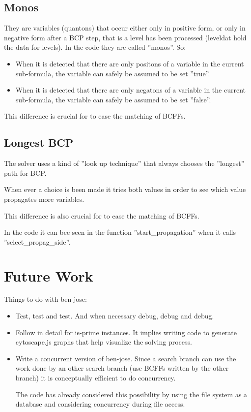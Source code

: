 \documentclass{easychair}
\newcommand{\quanton}{\textsf{quanton}}
\newcommand{\leveldat}{\textsf{leveldat}}
\begin{document}
\subsection{Monos}

They are variables ({\quanton}s) that occur either only in positive form, or only in negative form after a BCP step, that is a level has been processed ({\leveldat} hold the data for levels). In the code they are called ''monos''. So:

\begin{itemize}
\item
When it is detected that there are only positons of a variable in the current sub-formula, the variable can safely be assumed to be set ''true''. 

\item
When it is detected that there are only negatons of a variable in the current sub-formula, the variable can safely be assumed to be set ''false''. 
\end{itemize}

This difference is crucial for to ease the matching of BCFFs.

\subsection{Longest BCP}

The solver uses a kind of ''look up technique'' that always chooses the ''longest'' path for BCP. 

When ever a choice is been made it tries both values in order to see which value propagates more variables. 

This difference is also crucial for to ease the matching of BCFFs.

In the code it can bee seen in the function ''start\_propagation'' when it calls ''select\_propag\_side''.


\section{Future Work}
\label{sect:future-work}

Things to do with ben-jose:

\begin{itemize}
\item
Test, test and test. And when necessary debug, debug and debug.

\item
Follow in detail for is-prime instances. It implies writing code to generate cytoscape.js graphs that help visualize the solving process.

\item
Write a concurrent version of ben-jose. Since a search branch can use the work done by an other search branch (use BCFFs written by the other branch) it is conceptually efficient to do concurrency.

The code has already considered this possibility by using the file system as a database and considering concurrency during file access.

\end{itemize}
\end{document}

